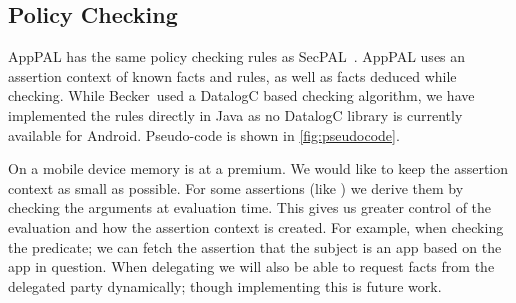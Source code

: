 \documentclass[]{llncs}
\begin{document}
\subsection{Policy Checking}
\label{ssec:eval}

AppPAL has the same policy checking rules as SecPAL~\cite{Becker:2006vh}.
AppPAL uses an assertion context of known facts and rules, as well as facts deduced while checking.
While Becker~\etal used a DatalogC based checking algorithm, we have implemented the rules directly in Java as no DatalogC library is currently available for Android.
Pseudo-code is shown in \autoref{fig:pseudocode}.

On a mobile device memory is at a premium.
We would like to keep the assertion context as small as possible.
For some assertions (like ) we derive them by checking the arguments at evaluation time.
This gives us greater control of the evaluation and how the assertion context is created.
For example, when checking the  predicate;
  we can fetch the assertion that the subject is an app based on the app in question.
When delegating we will also be able to request facts from the delegated party dynamically; though implementing this is future work.
\end{document}
